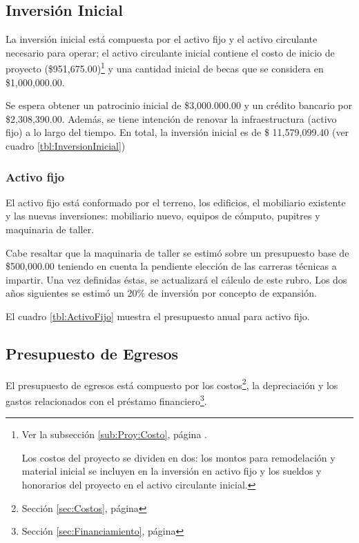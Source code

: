\subsection{Inversión Inicial}
\label{sub:oper:InversionInicial}

La inversión inicial está compuesta por el activo fijo y el activo circulante necesario para operar; el activo circulante inicial contiene el costo de inicio de proyecto (\$951,675.00)\footnote{Ver la subsección \ref{sub:Proy:Costo}, página \pageref{sub:Proy:Costo}.

Los costos del proyecto se dividen en dos: los montos para remodelación y material inicial se incluyen en la inversión en activo fijo y los sueldos y honorarios del proyecto en el activo circulante inicial.} y una cantidad inicial de becas que se considera en \$1,000,000.00.

Se espera obtener un patrocinio inicial de \$3,000.000.00 y un crédito bancario por \$2,308,390.00. Además, se tiene intención de renovar la infraestructura (activo fijo) a lo largo del tiempo. En total, la inversión inicial es de \$ 11,579,099.40 (ver cuadro \ref{tbl:InversionInicial})



\subsubsection{Activo fijo}

El activo fijo está conformado por el terreno, los edificios, el mobiliario existente y las nuevas inversiones: mobiliario nuevo, equipos de cómputo, pupitres y maquinaria de taller.

Cabe resaltar que la maquinaria de taller se estimó sobre un presupuesto base de \$500,000.00 teniendo en cuenta la pendiente elección de las carreras técnicas a impartir. Una vez definidas éstas, se actualizará el cálculo de este rubro. Los dos años siguientes se estimó un 20\% de inversión por concepto de expansión.

El cuadro \ref{tbl:ActivoFijo} muestra el presupuesto anual para activo fijo.



\subsection{Presupuesto de Egresos}

El presupuesto de egresos está compuesto por los costos\footnote{Sección \ref{sec:Costos}, página \pageref{sec:Costos}}, la depreciación y los gastos relacionados con el préstamo financiero\footnote{Sección \ref{sec:Financiamiento}, página \pageref{sec:Financiamiento}}.

